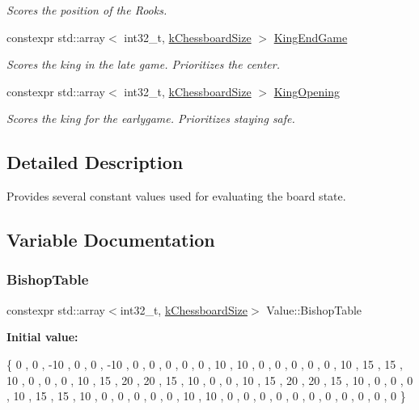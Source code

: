 \begin{DoxyCompactItemize}
\begin{DoxyCompactList}\small\item\em Scores the position of the Rooks. \end{DoxyCompactList}\item 
constexpr std\+::array$<$ int32\+\_\+t, \mbox{\hyperlink{constants_8h_a901d7bb0bf36a71e09079f9dd4168c4c}{k\+Chessboard\+Size}} $>$ \mbox{\hyperlink{namespaceValue_a581231b1446aff281ae15f755b875341}{King\+End\+Game}}
\begin{DoxyCompactList}\small\item\em Scores the king in the late game. Prioritizes the center. \end{DoxyCompactList}\item 
constexpr std\+::array$<$ int32\+\_\+t, \mbox{\hyperlink{constants_8h_a901d7bb0bf36a71e09079f9dd4168c4c}{k\+Chessboard\+Size}} $>$ \mbox{\hyperlink{namespaceValue_a0b4d4bb236eb7c18c48df42e6e3ca1fd}{King\+Opening}}
\begin{DoxyCompactList}\small\item\em Scores the king for the earlygame. Prioritizes staying safe. \end{DoxyCompactList}\end{DoxyCompactItemize}


\subsection{Detailed Description}
Provides several constant values used for evaluating the board state. 

\subsection{Variable Documentation}
\mbox{\label{namespaceValue_ab06336272528cf2e9e3772123f5eb5bb}} 
\subsubsection{\texorpdfstring{Bishop\+Table}{BishopTable}}
{\footnotesize\ttfamily constexpr std\+::array$<$int32\+\_\+t, \mbox{\hyperlink{constants_8h_a901d7bb0bf36a71e09079f9dd4168c4c}{k\+Chessboard\+Size}}$>$ Value\+::\+Bishop\+Table}

{\bfseries Initial value\+:}
\begin{DoxyCode}
\{
        0   ,   0   ,   -10 ,   0   ,   0   ,   -10 ,   0   ,   0   ,
        0   ,   0   ,   0   ,   10  ,   10  ,   0   ,   0   ,   0   ,
        0   ,   0   ,   10  ,   15  ,   15  ,   10  ,   0   ,   0   ,
        0   ,   10  ,   15  ,   20  ,   20  ,   15  ,   10  ,   0   ,
        0   ,   10  ,   15  ,   20  ,   20  ,   15  ,   10  ,   0   ,
        0   ,   0   ,   10  ,   15  ,   15  ,   10  ,   0   ,   0   ,
        0   ,   0   ,   0   ,   10  ,   10  ,   0   ,   0   ,   0   ,
        0   ,   0   ,   0   ,   0   ,   0   ,   0   ,   0   ,   0   
    \}
\end{DoxyCode}


